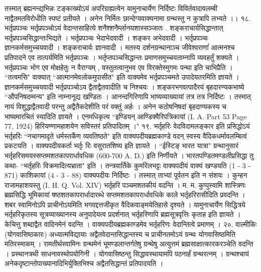 तस्मात् ब्रह्यनन्द्यभिन्नः टङ्काख्योऽयं अपरिग्राह्यत्वेन यामुनाचार्येण निर्दिष्टः विविर्तवादावलम्बी नाद्वैतमतविरोधीति स्पष्टं प्रतीयते । अनेन निर्मितः छान्देग्यवाक्यनामा ग्रन्थस्तु न कुत्रापि लभ्यते ।।
१८. भर्तृप्रपञ्चः
भर्तृप्रपञ्चोऽयं वेदान्तसाहित्ये शनैश्शनैर्म्लानयशास्सञ्जातः . शङ्कराचार्यसिद्धान्तात् भर्तृप्रपञ्चसिद्धान्तःभिद्यते । भर्तृप्रपञ्चः भेदाभेदवादी । शङ्कर अभेदवादी । भर्तृप्रपञ्चः ज्ञानकर्मसमुच्चयवादी । शङ्कराचार्यः ज्ञानवादी । मतस्य दर्शनग्रन्थानाञ्च जीवेश्वराणांं आत्मनश्च प्रतिपादने एव तात्पर्यमिति भर्तृप्रपञ्चः । भर्तृप्तपञ्चसिद्धान्तः प्रमाणसमुच्चयताम्नापि व्यवहर्तुं शक्यते । भर्तृप्रपञ्चः भोग एव मोक्षहेतुः न वैराग्यम् , वस्तुतत्वानुभव एव विरक्तेस्मुगमः पन्था इति चाभिप्रैति । ``तत्वमसि" वाक्यात् ``आत्मानमेवलोकमुपासीत" इति वाक्यमेव भर्तृप्रपञ्चमते उपादेयतरमिति ज्ञायते ।
ज्ञानकर्मसमुच्चयवादी भर्तृप्रपञ्चोऽय द्वैताद्वैतवादीति च निश्चयः । शङ्करभगवत्पादैरयं बृहदारण्यकभाष्ये ``औपनिषदम्मन्य" इति नाम्नानूद्य खण्डितः । आनन्दगिरिणापि भाष्यव्याख्यायां तत्र तत्र निर्दिष्टः । तस्मात् नायं विशुद्धाद्वैतवादी परन्तु अद्वैतैकदेशीति परं वक्तुं अर्हः । अनेन कठोषनिषदां बृहदाण्यकस्य च भाष्यमारचितं स्यादिति ज्ञायते ।
एनमधिकृत्य ``इण्डियन् आण्डिक्वैरिपत्रिकायां (I. A. Part 53 Page 77, 1924) हिरियण्णामहाशयेन सविस्तरं प्रतिपादितम् ।"
१९. भर्तृहरिः
वेदविदामलङ्कार इति प्रसिद्धोऽयं भर्तृहरिः ``नचागमादृते धर्मस्तर्केण व्यवतिष्ठते" इति वाक्यपदीयब्रह्मकाण्डे वदन् स्वस्य वैदिकधर्मावलम्बित्वं प्रकटयति । वाक्यपदीयकर्ता भर्तृः रिः वसुरातशिष्य इति ज्ञायते । ``ईस्टिङ् भारत यात्रा" ग्रन्थानुसारं भर्तृहरिसमयस्सप्तमशतकापरार्धावधिक (600-700 A. D.) इति निर्णीयते । भारतपण्डितमण्डलीप्रसिद्धा तु कथा- ``भर्तृहरिः विक्रमादित्यभ्राता" इति । तन्त्रवार्तिके कुमरिलभट्टः वाक्यपदीयं वाक्यं खण्डयति (1 - 3 - 871) काशिकायां (4 - 3 - 88) वाक्यपदीयः निर्दिष्टः । तस्मात् ताभ्यां पूर्वतन इति न संशयः । कुन्हन राजामहाशयस्तु (I. H. Q. Vol. XIV) भर्तृहरि पञ्चमशतकीयं वदन्ति । म. म. कुप्पुस्वामि शास्त्रिणः ब्रह्मसिद्धि भूमिकायां षष्ठशतकापरार्धादारब्धे सप्तमशतकापरार्धावधिके काले भर्तृहरिरासीदिति प्रवदन्ति । शबर स्वामिनोऽपि प्राचीनोऽयमिति भगवद्दत्तजीकृत वैदिकवाङ्मयेतिहासे दृश्यते ।
यामुनाचार्येण सिद्धित्रये भर्तृहरिकृतस्य सूत्रव्याख्यानस्य अनुपादेयत्व प्रदर्शनात् भर्तृहरिणापि ब्रह्मसूत्रवृत्तिः कृताह इति ज्ञायते । केचित्तु शब्दाद्वैत वादिनमेनं वदन्ति । वाक्यपदीयब्रह्मकाण्डमेव भर्तृहरिणः वेदान्तित्वे प्रमाणम् ।
२०. वाल्मीकिः (योगवासिष्ठकारः)
अध्यात्मविद्यायाः अद्वैतवेदान्तसिद्धान्तस्य च प्राचीनतमोऽयं ग्रन्थः योगवासिष्ठमिति मतिरस्माकम् । रामतीर्थस्वामिनः ग्रन्थमेनं भूमण्डलान्तर्गतेषु ग्रन्थेषु अत्युत्तमं ब्रह्मसाक्षात्कारकरञ्चेति वदन्ति । प्रस्थानत्रथी साधनावस्थोपयोगिनी । योगवासिष्ठन्तु सिद्धावस्थायामपि पठनार्हं ग्रन्थरत्नम् । ग्रन्थश्चायं अनेकदृष्टान्तोपाख्यानादिभिर्युक्तिभिश्च अद्वैतसिद्धान्तं प्रतिपादयति ।
